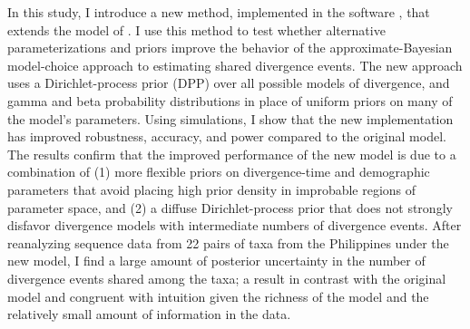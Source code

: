 

In this study, I introduce a new method, implemented in the software
\dppmsbayes, that extends the model of \msb.
I use this method to test whether alternative parameterizations and priors
improve the behavior of the approximate-Bayesian model-choice approach to
estimating shared divergence events.
The new approach uses a Dirichlet-process prior (DPP) over all possible models
of divergence, and gamma and beta probability distributions in place of uniform
priors on many of the model's parameters.
Using simulations, I show that the new implementation has improved robustness,
accuracy, and power compared to the original model.
The results confirm that the improved performance of the new model
is due to a combination of
(1) more flexible priors on divergence-time and demographic parameters that
avoid placing high prior density in improbable regions of parameter space, and
(2) a diffuse Dirichlet-process prior that does not strongly disfavor
divergence models with intermediate numbers of divergence events.
After reanalyzing sequence data from 22 pairs of taxa from the Philippines
\cite{Oaks2012} under the new model, I find a large amount of posterior
uncertainty in the number of divergence events shared among the taxa; a result
in contrast with the original \msb model and congruent with
intuition given the richness of the model and the relatively small amount of
information in the data.


